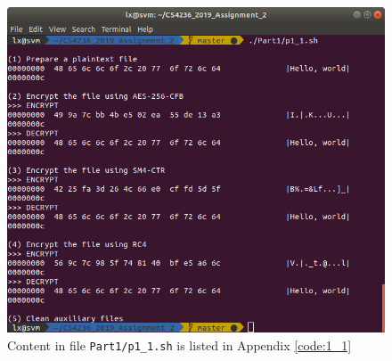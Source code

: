 \begin{figure}[tb!]
\centering
\includegraphics[width=\columnwidth]{pictures/p1_1.png}
\caption{
    Content in file \texttt{Part1/p1\_1.sh} is listed in Appendix \ref{code:1_1}
}
\label{fig:p1_1}
\end{figure}

